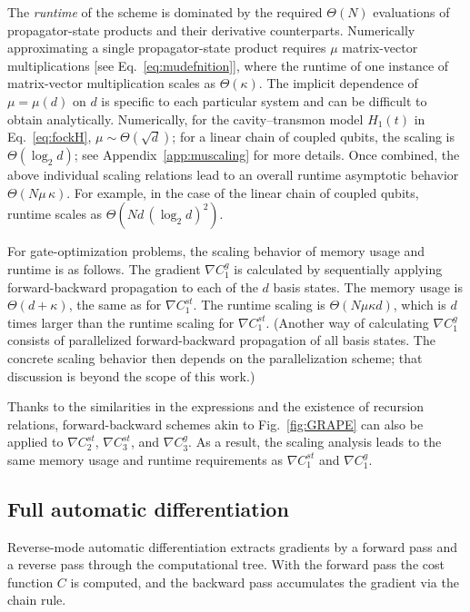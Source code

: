 The \textit{runtime} of the scheme is dominated by the required $\Theta(N)$ evaluations of propagator-state products and their derivative counterparts. Numerically approximating a single propagator-state product requires $\mu$ matrix-vector multiplications [see Eq.~\eqref{eq:mudefnition}], where the runtime of one instance of matrix-vector multiplication scales as $\Theta(\kappa)$.  The implicit dependence of $\mu=\mu(d)$ on $d$ is specific to each particular system and can be difficult to obtain analytically. Numerically, for the cavity--transmon model $H_1(t)$ in Eq.~\eqref{eq:fockH}, $\mu\sim\Theta(\sqrt{d})$; for a linear chain of coupled qubits, the scaling is $\Theta(\log_2 d)$; see Appendix~\ref{app:muscaling} for more details.
Once combined, the above individual scaling relations lead to an overall runtime asymptotic behavior
$\Theta(N\mu\, \kappa)$. For example, in the case of the linear chain of coupled qubits, runtime scales as $\Theta(Nd\, (\log_2 d )^2)$.

For gate-optimization problems, the scaling behavior of memory usage and runtime is as follows. The gradient $\nabla C_1^{ g}$ is calculated by sequentially
applying forward-backward propagation to each of the $d$ basis states. The memory usage is $\Theta(d+\kappa)$, the same as for $\nabla C_1^{st}$. The runtime scaling is $\Theta(N\mu\kappa d)$, which is $d$ times larger than the runtime scaling for $\nabla C_1^{st}$. (Another way of calculating $\nabla C_1^{ g}$ consists of parallelized forward-backward propagation of all basis states. The concrete scaling behavior then depends on the parallelization scheme; that discussion is beyond the scope of this work.)

Thanks to the similarities in the expressions and the existence of recursion relations, forward-backward schemes akin to Fig.~\ref{fig:GRAPE}
can also be applied to $\nabla C_2^{st}$, $\nabla C_3^{st}$, and $\nabla C_3^{g}$. As a result, the scaling analysis leads to the same memory usage and runtime requirements as $\nabla C_1^{st}$ and $\nabla C_1^{g}$.



\subsection{Full automatic differentiation}
\label{subsec:scale-full-ad}

Reverse-mode automatic differentiation extracts gradients by a forward pass and a reverse pass through the computational tree. With the forward pass the cost function $C$ is computed, and the backward pass accumulates the gradient via the chain rule.

